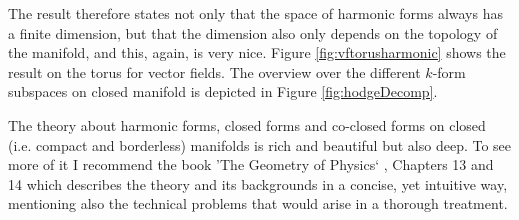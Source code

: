 The result therefore states not only that the space of harmonic forms always has a finite dimension, but that the dimension also only depends on the topology of the manifold, and this, again, is very nice. Figure \ref{fig:vftorusharmonic} shows the result on the torus for vector fields. The overview over the different $k$-form subspaces on closed manifold is depicted in Figure \ref{fig:hodgeDecomp}.


The theory about harmonic forms, closed forms and co-closed forms on closed (i.e. compact and borderless) manifolds is rich and beautiful but also deep. To see more of it I recommend the book 'The Geometry of Physics` \cite{FRANKEL11}, Chapters 13 and 14 which describes the theory and its backgrounds in a concise, yet intuitive way, mentioning also the technical problems that would arise in a thorough treatment.

